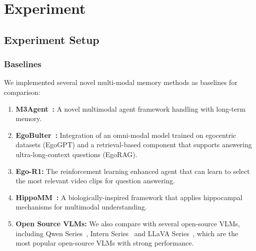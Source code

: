 \section{Experiment}\label{sec:experiment}
\subsection{Experiment Setup}\label{sub:exp_setup}


\subsubsection{Baselines}
We implemented several novel multi-modal memory methods as baselines for comparison:

\begin{enumerate}
    \item \textbf{M3Agent~\cite{long2025M3Agent}: } A novel multimodal agent framework handling with long-term memory.
    \item \textbf{EgoBulter~\cite{yang2025EgoLife}: } Integration of an omni-modal model trained on egocentric datasets (EgoGPT) and a retrieval-based component that supports answering ultra-long-context questions (EgoRAG).
    \item \textbf{Ego-R1\cite{tian2025EgoR1}: } The reinforcement learning enhanced agent that can learn to select the most relevant video clips for question answering.
    \item \textbf{HippoMM~\cite{lin2025HippoMM}: } A biologically-inspired framework that applies hippocampal mechanisms for multimodal understanding.
    \item \textbf{Open Source VLMs: } We also compare with several open-source VLMs, including Qwen Series~\cite{yang2024Qwen2,qwen2025Qwen25,xu2025qwen25omni, yang2025Qwen3}, Intern Series~\cite{zhu2025InternVL3, wang2025InternVideo25} and LLaVA Series~\cite{liu2023LLaVA, li2024LLaVAOneVision, zhang2025LLaVAVideo}, which are the most popular open-source VLMs with strong performance.
\end{enumerate}

